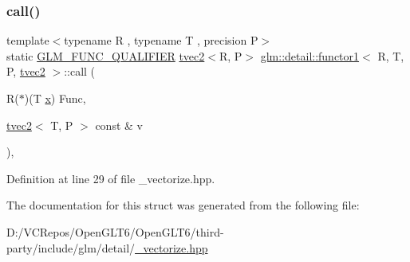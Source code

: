 \subsubsection{\texorpdfstring{call()}{call()}}
{\footnotesize\ttfamily template$<$typename R , typename T , precision P$>$ \\
static \mbox{\hyperlink{setup_8hpp_a33fdea6f91c5f834105f7415e2a64407}{G\+L\+M\+\_\+\+F\+U\+N\+C\+\_\+\+Q\+U\+A\+L\+I\+F\+I\+ER}} \mbox{\hyperlink{structglm_1_1tvec2}{tvec2}}$<$R, P$>$ \mbox{\hyperlink{structglm_1_1detail_1_1functor1}{glm\+::detail\+::functor1}}$<$ R, T, P, \mbox{\hyperlink{structglm_1_1tvec2}{tvec2}} $>$\+::call (\begin{DoxyParamCaption}\item[{R($\ast$)(T \mbox{\hyperlink{glad_8h_a92d0386e5c19fb81ea88c9f99644ab1d}{x}})}]{Func,  }\item[{\mbox{\hyperlink{structglm_1_1tvec2}{tvec2}}$<$ T, P $>$ const \&}]{v }\end{DoxyParamCaption})\hspace{0.3cm}{\ttfamily [inline]}, {\ttfamily [static]}}



Definition at line 29 of file \+\_\+vectorize.\+hpp.



The documentation for this struct was generated from the following file\+:\begin{DoxyCompactItemize}
\item 
D\+:/\+V\+C\+Repos/\+Open\+G\+L\+T6/\+Open\+G\+L\+T6/third-\/party/include/glm/detail/\mbox{\hyperlink{__vectorize_8hpp}{\+\_\+vectorize.\+hpp}}\end{DoxyCompactItemize}
